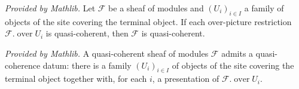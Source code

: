 \begin{lemma}
  \label{lem:isQuasicoherent_of_coversTop_mathlib}
  \mathlibok
  \textit{Provided by Mathlib.}
  Let \(\mathcal{F}\) be a sheaf of modules and \((U_i)_{i \in I}\) a family of objects of the site
  covering the terminal object. If each over-picture restriction \(\mathcal{F}.\operatorname{over} U_i\)
  is quasi-coherent, then \(\mathcal{F}\) is quasi-coherent.
\end{lemma}

\begin{lemma}
  \label{lem:nonempty_quasicoherentData_mathlib}
  \mathlibok
  \textit{Provided by Mathlib.}
  A quasi-coherent sheaf of modules \(\mathcal{F}\) admits a quasi-coherence datum: there is a family
  \((U_i)_{i \in I}\) of objects of the site covering the terminal object together with, for each \(i\),
  a presentation of \(\mathcal{F}.\operatorname{over} U_i\).
\end{lemma}

